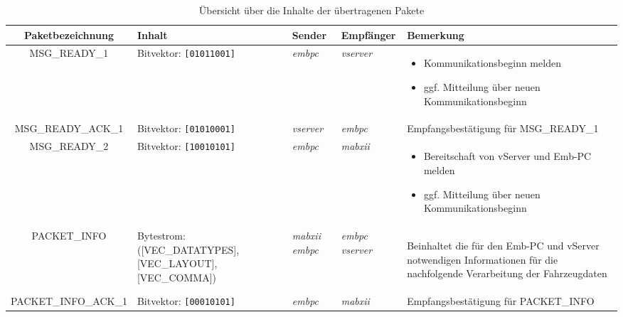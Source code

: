 \documentclass[fontsize = 12pt, paper = a4]{scrreprt}
\begin{document}
\begin{table}[H]
\centering

\caption{Übersicht über die Inhalte der übertragenen Pakete}

 \begin{tabular}{ c | p{4cm} | p{1.5cm} | p{2cm} | p{4cm} }
 
 \toprule[1.5pt]
 
 Paket\-bezeichnung & Inhalt & Sender & Empfänger & Bemerkung \\
 
 \midrule
 
MSG\_READY\_1 & Bitvektor: \texttt{[01011001]} & \emph{embpc} & \emph{vserver} &

\vspace*{-8mm}

\begin{itemize}[leftmargin=*] 

\item Kommunikations\-beginn melden
\item ggf. Mitteilung über neuen Kommunikationsbeginn

\end{itemize} \\

\midrule

MSG\_READY\_ACK\_1 & Bitvektor: \texttt{[01010001]} & \emph{vserver} & \emph{embpc} & Empfangsbestätigung für MSG\_READY\_1 \\

\midrule

MSG\_READY\_2 & Bitvektor: \texttt{[10010101]} & \emph{embpc} & \emph{mabxii} &

\vspace*{-8mm}

\begin{itemize}[leftmargin=*]
\item Bereitschaft von vServer und Emb-PC melden
\item ggf. Mitteilung über neuen Kommunikationsbeginn
\end{itemize} \\

\midrule

PACKET\_INFO & Bytestrom: ([VEC\_DATATYPES], [VEC\_LAYOUT], [VEC\_COMMA]) &
\emph{mabxii} \emph{embpc}& \emph{embpc} \emph{vserver} & 

\vspace*{-8mm}

\begin{flushleft}
Beinhaltet die für den Emb-PC und vServer notwendigen Informationen für die nachfolgende Verarbeitung der Fahrzeugdaten
\end{flushleft} \\

\midrule

PACKET\_INFO\_ACK\_1 & Bitvektor: \texttt{[00010101]} & \emph{embpc} & \emph{mabxii} & 
Empfangsbe\-stätigung für PACKET\_INFO \\

\bottomrule[1.5pt] 
 
\end{tabular}

\end{table}
\label{paketinhalt}
\newpage
\end{document}
